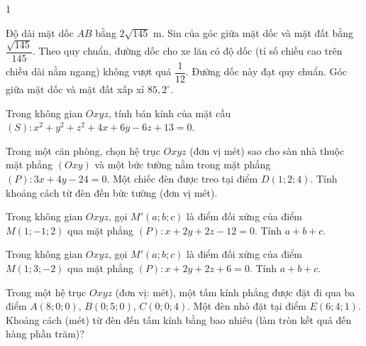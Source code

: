\begin{deontap}{1}
\begin{cau}
\begin{dungsai}
  \y Độ dài mặt dốc $AB$ bằng $2 \sqrt{145}$ m. \oDS
  \y Sin của góc giữa mặt dốc và mặt đất bằng $\dfrac{\sqrt{145}}{145}$. \oDS
  \y Theo quy chuẩn, đường dốc cho xe lăn có độ dốc (tỉ số chiều cao trên chiều dài nằm ngang) không vượt quá $\dfrac{1}{12}$. Đường dốc này đạt quy chuẩn. \oDS
  \y Góc giữa mặt dốc và mặt đất xấp xỉ $85{,}2^\circ$. \oDS
\end{dungsai}
\end{cau}
\phanIII
\begin{cau}Trong không gian $Oxyz$, tính bán kính của mặt cầu $(S)\colon x^2+y^2+z^2+4x+6y-6z+13=0$.\otraloi
{}\end{cau}
\begin{cau}Trong một căn phòng, chọn hệ trục $Oxyz$ (đơn vị mét) sao cho sàn nhà thuộc mặt phẳng $(Oxy)$ và một bức tường nằm trong mặt phẳng $(P)\colon 3x+4y-24=0$. Một chiếc đèn được treo tại điểm $D(1;2;4)$. Tính khoảng cách từ đèn đến bức tường (đơn vị mét).\otraloi
{}\end{cau}
\begin{cau}Trong không gian $Oxyz$, gọi $M'(a;b;c)$ là điểm đối xứng của điểm $M(1;-1;2)$ qua mặt phẳng $(P)\colon x+2y+2z-12=0$. Tính $a+b+c$.\otraloi
{}\end{cau}
\begin{cau}Trong không gian $Oxyz$, gọi $M'(a;b;c)$ là điểm đối xứng của điểm $M(1;3;-2)$ qua mặt phẳng $(P)\colon x+2y+2z+6=0$. Tính $a+b+c$.\otraloi
{}\end{cau}
\begin{cau}Trong một hệ trục $Oxyz$ (đơn vị: mét), một tấm kính phẳng được đặt đi qua ba điểm $A(8;0;0)$, $B(0;5;0)$, $C(0;0;4)$. Một đèn nhỏ đặt tại điểm $E(6;4;1)$. Khoảng cách (mét) từ đèn đến tấm kính bằng bao nhiêu (làm tròn kết quả đến hàng phần trăm)?
\end{cau}
\end{deontap}
